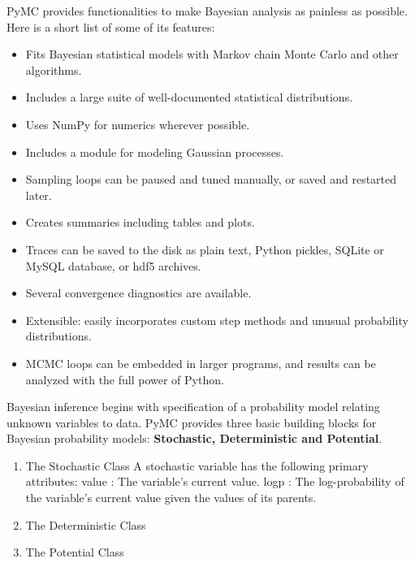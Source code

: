 \documentclass[a4paper,10pt]{article}
\begin{document}
PyMC provides functionalities to make Bayesian analysis as painless as
possible. Here is a short list of some of its features:
\begin{itemize}
 \item Fits Bayesian statistical models with Markov chain Monte Carlo and
    other algorithms.
\item Includes a large suite of well-documented statistical distributions.
\item   Uses NumPy for numerics wherever possible.
\item   Includes a module for modeling Gaussian processes.
\item   Sampling loops can be paused and tuned manually, or saved and
    restarted later.
\item   Creates summaries including tables and plots.
\item   Traces can be saved to the disk as plain text, Python pickles,
    SQLite or MySQL database, or hdf5 archives.
\item   Several convergence diagnostics are available.
\item   Extensible: easily incorporates custom step methods and unusual
    probability distributions.
\item   MCMC loops can be embedded in larger programs, and results can be
    analyzed with the full power of Python.
\end{itemize}
Bayesian inference begins with specification of a probability model relating unknown variables to data. PyMC provides three basic
building blocks for Bayesian probability models: \textbf{Stochastic, Deterministic and Potential}.
\begin{enumerate}
 \item The Stochastic Class
A stochastic variable has the following primary attributes:
value : The variable's current value.
logp : The log-probability of the variable's current value given the values of its parents.
 \item The Deterministic Class
 \item The Potential Class
\end{enumerate}
\end{document}
